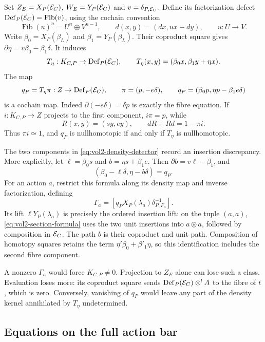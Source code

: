 Set $Z_E=X_P(\mathcal E_C)$, $W_E=Y_P(\mathcal E_C)$ and
$v=\delta_{P,\mathcal E_C}$. Define its factorization defect
$\operatorname{Def}_P(\mathcal E_C)=\operatorname{Fib}(v)$,
using the cochain convention
\begin{equation}\label{eq:vol2-density-fibre-convention}
 \operatorname{Fib}(u)^n=U^n\oplus V^{n-1},\qquad
 d(x,y)=(dx,ux-dy),\qquad u:U\to V.
\end{equation}
Write $\beta_0=X_P(\beta_L)$ and
$\beta_1=Y_P(\beta_L)$. Their coproduct square gives
$\partial\eta=v\beta_0-\beta_1\delta$.
It induces
\[
 T_\eta:K_{C,P}\to\operatorname{Def}_P(\mathcal E_C),
 \qquad T_\eta(x,y)=(\beta_0x,\beta_1y+\eta x).
\]
The map
\begin{equation}\label{eq:vol2-density-detector}
 q_P=T_\eta\pi:Z\to\operatorname{Def}_P(\mathcal E_C),\qquad
 \pi=(p,-e\delta),\qquad
 q_P=(\beta_0p,\eta p-\beta_1e\delta)
\end{equation}
is a cochain map. Indeed $\partial(-e\delta)=\delta p$
is exactly the fibre equation. If $i:K_{C,P}\to Z$
projects to the first component, $i\pi=p$, while
\[
 R(x,y)=(sy,ey),\qquad dR+Rd=1-\pi i.
\]
Thus $\pi i\simeq1$, and $q_P$ is nullhomotopic if
and only if $T_\eta$ is nullhomotopic.

The two components in \eqref{eq:vol2-density-detector}
record an insertion discrepancy. More explicitly,
let $\ell=\beta_0s$ and $b=\eta s+\beta_1e$.
Then $\partial b=v\ell-\beta_1$, and
\[
 (\beta_0-\ell\delta,\eta-b\delta)=q_P.
\]
For an action $a$, restrict this formula along its
density map and inverse factorization, defining
\begin{equation}\label{eq:vol2-insertion-class}
 \Gamma_a=
 [q_PX_P(\lambda_a)\delta_{P,F_a}^{-1}].
\end{equation}
Its lift $\ell Y_P(\lambda_a)$ is precisely the
ordered insertion lift: on the tuple $(a,a)$,
\eqref{eq:vol2-section-formula} uses the two unit
insertions into $a\circledast a$, followed by
composition in $\mathcal E_C$. The path $b$ is their
coproduct and unit path. Composition of homotopy
squares retains the term
$\eta'\beta_0+\beta'_1\eta$, so this identification
includes the second fibre component.

A nonzero $\Gamma_a$ would force $K_{C,P}\ne0$.
Projection to $Z_E$ alone can lose such a class.
Evaluation loses more: its coproduct square sends
$\operatorname{Def}_P(\mathcal E_C)\mathbin{\otimes^!} A$ to the fibre
of $t$, which is zero. Conversely, vanishing of
$q_P$ would leave any part of the density kernel
annihilated by $T_\eta$ undetermined.

\subsection{Equations on the full action bar}

